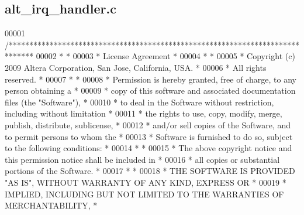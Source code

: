 \subsection{alt\+\_\+irq\+\_\+handler.\+c}
\label{alt__irq__handler_8c_source}

\begin{DoxyCode}
00001 \textcolor{comment}{/******************************************************************************}
00002 \textcolor{comment}{*                                                                             *}
00003 \textcolor{comment}{* License Agreement                                                           *}
00004 \textcolor{comment}{*                                                                             *}
00005 \textcolor{comment}{* Copyright (c) 2009      Altera Corporation, San Jose, California, USA.      *}
00006 \textcolor{comment}{* All rights reserved.                                                        *}
00007 \textcolor{comment}{*                                                                             *}
00008 \textcolor{comment}{* Permission is hereby granted, free of charge, to any person obtaining a     *}
00009 \textcolor{comment}{* copy of this software and associated documentation files (the "Software"),  *}
00010 \textcolor{comment}{* to deal in the Software without restriction, including without limitation   *}
00011 \textcolor{comment}{* the rights to use, copy, modify, merge, publish, distribute, sublicense,    *}
00012 \textcolor{comment}{* and/or sell copies of the Software, and to permit persons to whom the       *}
00013 \textcolor{comment}{* Software is furnished to do so, subject to the following conditions:        *}
00014 \textcolor{comment}{*                                                                             *}
00015 \textcolor{comment}{* The above copyright notice and this permission notice shall be included in  *}
00016 \textcolor{comment}{* all copies or substantial portions of the Software.                         *}
00017 \textcolor{comment}{*                                                                             *}
00018 \textcolor{comment}{* THE SOFTWARE IS PROVIDED "AS IS", WITHOUT WARRANTY OF ANY KIND, EXPRESS OR  *}
00019 \textcolor{comment}{* IMPLIED, INCLUDING BUT NOT LIMITED TO THE WARRANTIES OF MERCHANTABILITY,    *}

\end{DoxyCode}
